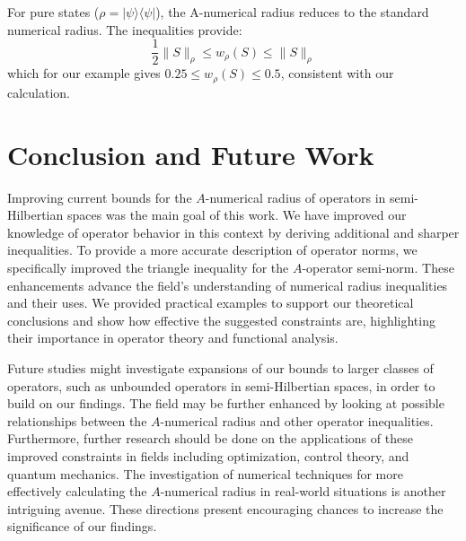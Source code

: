 \documentclass{article}
\begin{document}
For pure states ($\rho = |\psi\rangle\langle\psi|$), the A-numerical radius reduces to the standard numerical radius. The inequalities provide:
\[ \frac{1}{2}\|S\|_\rho \leq w_\rho(S) \leq \|S\|_\rho \]
which for our example gives $0.25 \leq w_\rho(S) \leq 0.5$, consistent with our calculation.

\section{Conclusion and Future Work}
Improving current bounds for the $A$-numerical radius of operators in semi-Hilbertian spaces was the main goal of this work. We have improved our knowledge of operator behavior in this context by deriving additional and sharper inequalities. To provide a more accurate description of operator norms, we specifically improved the triangle inequality for the $A$-operator semi-norm. These enhancements advance the field's understanding of numerical radius inequalities and their uses. We provided practical examples to support our theoretical conclusions and show how effective the suggested constraints are, highlighting their importance in operator theory and functional analysis.

Future studies might investigate expansions of our bounds to larger classes of operators, such as unbounded operators in semi-Hilbertian spaces, in order to build on our findings. The field may be further enhanced by looking at possible relationships between the $A$-numerical radius and other operator inequalities. Furthermore, further research should be done on the applications of these improved constraints in fields including optimization, control theory, and quantum mechanics. The investigation of numerical techniques for more effectively calculating the $A$-numerical radius in real-world situations is another intriguing avenue. These directions present encouraging chances to increase the significance of our findings.
\end{document}
